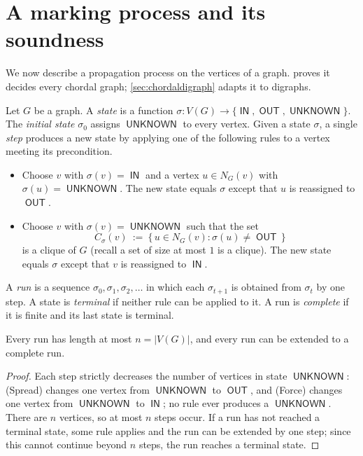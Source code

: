 \documentclass[11pt]{article}
\numberwithin{equation}{section}
\theoremstyle{plain}
\newcommand{\V}{V}
\newcommand{\st}{\sigma}                   %
\DeclareMathOperator{\IN}{\mathsf{IN}}
\DeclareMathOperator{\OUT}{\mathsf{OUT}}
\DeclareMathOperator{\UNK}{\mathsf{UNKNOWN}}
\begin{document}
\section{A marking process and its soundness}
\label{sec:process}

We now describe a propagation process on the vertices of a graph. 
proves it decides every chordal graph; \cref{sec:chordaldigraph} adapts it to digraphs.

\begin{definition}\label{def:process}
Let $G$ be a graph. A \emph{state} is a function
$\st\colon\V(G)\to\{\IN,\OUT,\UNK\}$. The \emph{initial state} $\st_0$ assigns $\UNK$ to
every vertex. Given a state $\st$, a single \emph{step} produces a new state by applying
one of the following rules to a vertex meeting its precondition.
\begin{itemize}[leftmargin=1.6em,itemsep=0.4ex]
\item[\textbf{(Spread)}] Choose $v$ with $\st(v)=\IN$ and a vertex $u\in N_G(v)$ with
$\st(u)=\UNK$. The new state equals $\st$ except that $u$ is reassigned to $\OUT$.
\item[\textbf{(Force)}] Choose $v$ with $\st(v)=\UNK$ such that the set
\[
  C_\st(v)\ :=\ \{\,u\in N_G(v):\st(u)\neq\OUT\,\}
\]
is a clique of $G$ (recall a set of size at most $1$ is a clique). The new state equals
$\st$ except that $v$ is reassigned to $\IN$.
\end{itemize}
A \emph{run} is a sequence $\st_0,\st_1,\st_2,\dots$ in which each $\st_{t+1}$ is obtained
from $\st_t$ by one step. A state is \emph{terminal} if neither rule can be applied to
it. A run is \emph{complete} if it is finite and its last state is terminal.
\end{definition}

\begin{lemma}[Termination]\label{lem:terminate}
Every run has length at most $n=|\V(G)|$, and every run can be extended to a complete
run.
\end{lemma}

\begin{proof}
Each step strictly decreases the number of vertices in state $\UNK$: (Spread) changes
one vertex from $\UNK$ to $\OUT$, and (Force) changes one vertex from $\UNK$ to $\IN$;
no rule ever produces a $\UNK$. There are $n$ vertices, so at most $n$ steps occur. If a
run has not reached a terminal state, some rule applies and the run can be extended by
one step; since this cannot continue beyond $n$ steps, the run reaches a terminal state.
\end{proof}
\end{document}
